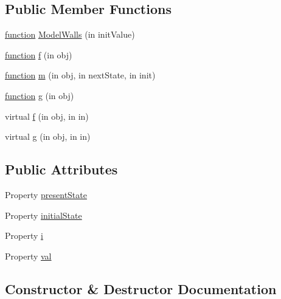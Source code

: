 \subsection*{Public Member Functions}
\begin{DoxyCompactItemize}
\item 
\hyperlink{_plan__desuma_functions_8m_ac2ffb26d6f42d3bbcd7847b0873403f4}{function} \hyperlink{class_model_walls_a5aa5cfd2186c06e8ab37ce531b1a9720}{Model\+Walls} (in init\+Value)
\item 
\hyperlink{_plan__desuma_functions_8m_ac2ffb26d6f42d3bbcd7847b0873403f4}{function} \hyperlink{class_model_walls_af07620c51528eb1e504befcf52ca0cee}{f} (in obj)
\item 
\hyperlink{_plan__desuma_functions_8m_ac2ffb26d6f42d3bbcd7847b0873403f4}{function} \hyperlink{class_model_walls_a3140f24c6c4b80037b7d4f521c6ae2d3}{m} (in obj, in next\+State, in init)
\item 
\hyperlink{_plan__desuma_functions_8m_ac2ffb26d6f42d3bbcd7847b0873403f4}{function} \hyperlink{class_model_walls_a07dadfabe92bf9a144b8a862720e7746}{g} (in obj)
\item 
virtual \hyperlink{class_model_s_e_d_ac36f9451c43b120828af4380858f2024}{f} (in obj, in in)
\item 
virtual \hyperlink{class_model_s_e_d_a2d53b5f665cfcf64d482bbfa8a6eb098}{g} (in obj, in in)
\end{DoxyCompactItemize}
\subsection*{Public Attributes}
\begin{DoxyCompactItemize}
\item 
Property \hyperlink{class_model_walls_a9624cc7c421a50fa5086b0ebd0cd5fe3}{present\+State}
\item 
Property \hyperlink{class_model_walls_acd9263acfa96c9138afdf497e55acc24}{initial\+State}
\item 
Property \hyperlink{class_model_walls_a103c618d75e54c3a72fac6bcaa59f61f}{i}
\item 
Property \hyperlink{class_model_walls_aae3a423b8c844683e2adba0472347fe1}{val}
\end{DoxyCompactItemize}


\subsection{Constructor \& Destructor Documentation}
\mbox{\label{class_model_walls_a5aa5cfd2186c06e8ab37ce531b1a9720}} 
